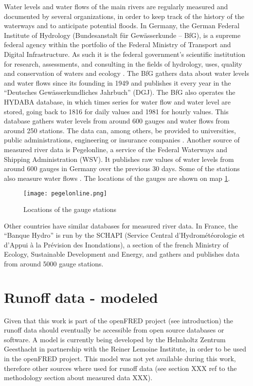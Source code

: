 \label{meas_runoff}
Water levels and water flows of the main rivers are regularly measured and documented by several organizations, in order to keep track of the history of the waterways and to anticipate potential floods. In Germany, the German Federal Institute of Hydrology (Bundesanstalt für Gewässerkunde – BfG), is a supreme federal agency within the portfolio of the Federal Ministry of Transport and Digital Infrastructure. As such it is the federal government's scientific institution for research, assessments, and consulting in the fields of hydrology, uses, quality and conservation of waters and ecology \cite{bafg}. The BfG gathers data about water levels and water flows since its founding in 1949 and publishes it every year in the ``Deutsches Gewässerkundliches Jahrbuch'' (DGJ). The BfG also operates the HYDABA database, in which times series for water flow and water level are stored, going back to 1816 for daily values and 1981 for hourly values. This database gathers water levels from around 600 gauges and water flows from around 250 stations. The data can, among others, be provided to universities, public administrations, engineering or insurance companies \cite{bafg_hyd}. \newline
Another source of measured river data is Pegelonline, a service of the Federal Waterways and Shipping Administration (WSV). It publishes raw values of water levels from around 600 gauges in Germany over the previous 30 days. Some of the stations also measure water flows \cite{pegelonline}. The locations of the gauges are shown on map \ref{pegelonline}.

\begin{figure}[H]
\centering
\texttt{[image: pegelonline.png]}
\caption[Locations of the gauge stations]{Locations of the gauge stations \cite{pegelonline}}
\label{pegelonline}
\end{figure}

Other countries have similar databases for measured river data. In France, the ``Banque Hydro'' is run by the SCHAPI (Service Central d'Hydrométéorologie et d'Appui à la Prévision des Inondations), a section of the french Ministry of Ecology, Sustainable Development and Energy, and gathers and publishes data from around 5000 gauge stations.

\section{Runoff data - modeled}

Given that this work is part of the openFRED project (see introduction) the runoff data should eventually be accessible from open source databases or software. A model is currently being developed by the Helmholtz Zentrum Geesthacht in partnership with the Reiner Lemoine Institute, in order to be used in the openFRED project. This model was not yet available during this work, therefore other sources where used for runoff data (see section XXX ref to the methodology section about measured data XXX).
